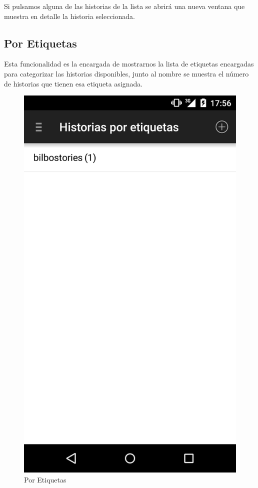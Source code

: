 \documentclass[11pt,a4paper, titlepage]{article}
\begin{document}
	Si pulsamos alguna de las historias de la lista se abrirá una nueva ventana que muestra en detalle la historia seleccionada.
	
	\FloatBarrier
	
	\newpage
	\subsection[Por Etiquetas]{Por Etiquetas}
	
	Esta funcionalidad es la encargada de mostrarnos la lista de etiquetas encargadas para categorizar las historias disponibles, junto al nombre se muestra el número de historias que tienen esa etiqueta asignada.
	
	\begin{figure}[!h]
		\centering
		\includegraphics[scale = 0.18 ]{img/6}
		\caption{Por Etiquetas}
		\label{p13}
	\end{figure}
	
\end{document}
